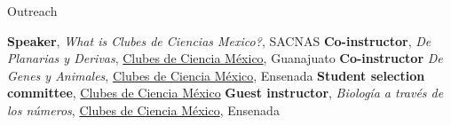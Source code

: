 \begin{rubric}{Outreach}

\entry*[2017]
	\textbf{Speaker}, \emph{What is Clubes de Ciencias Mexico?}, SACNAS
\entry*[2016]
	\textbf{Co-instructor}, \emph{De Planarias y Derivas},
	\href{http://www.clubesdeciencia.mx/}{Clubes de Ciencia México}, Guanajuato
\entry*[2016]
	  \textbf{Co-instructor} \emph{De Genes y Animales},
		\href{http://www.clubesdeciencia.mx/}{Clubes de Ciencia México}, Ensenada
\entry*[2015]
	  \textbf{Student selection committee},
		\href{http://www.clubesdeciencia.mx/}{Clubes de Ciencia México}
\entry*[2014]
  \textbf{Guest instructor}, \emph{Biología a través de los números},
	\href{http://www.clubesdeciencia.mx/}{Clubes de Ciencia México}, Ensenada

\end{rubric}
